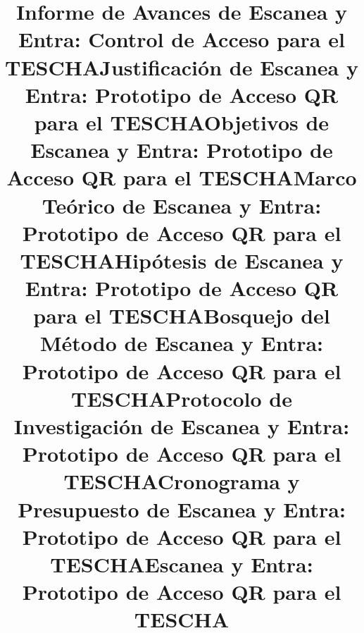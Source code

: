 \documentclass[stu,11pt,floatsintext,biblatex]{apa7}
\title{Informe de Avances de Escanea y Entra: Control de Acceso para el TESCHA}
\title{Justificación de Escanea y Entra: Prototipo de Acceso QR para el TESCHA}
\title{Objetivos de Escanea y Entra: Prototipo de Acceso QR para el TESCHA}
\title{Marco Teórico de Escanea y Entra: Prototipo de Acceso QR para el TESCHA}
\title{Hipótesis de Escanea y Entra: Prototipo de Acceso QR para el TESCHA}
\title{Bosquejo del Método de Escanea y Entra: Prototipo de Acceso QR para el TESCHA}
\title{Protocolo de Investigación de Escanea y Entra: Prototipo de Acceso QR para el TESCHA}
\title{Cronograma y Presupuesto de Escanea y Entra: Prototipo de Acceso QR para el TESCHA}
\title{Escanea y Entra: Prototipo de Acceso QR para el TESCHA}
\begin{document}
\maketitle
\justifying

\ifdefined\solomarcoteorico
	

	\printbibliography
\else
\ifdefined\solohipotesis
	

	\printbibliography
\else
\ifdefined\solocronograma
	
\else
\ifdefined\soloprotocolo
	

	

	\clearpage
	

	\clearpage
	

	\clearpage
	

	\clearpage
	

	\clearpage
	

	\clearpage
	

	\printbibliography

	\appendix

	\clearpage
	

	\clearpage
	

	\clearpage
	

	\clearpage
	

	\clearpage
	

	\clearpage
	

	\clearpage
	
\else
\ifdefined\solometodo
	

	\printbibliography

	\appendix

	\clearpage
	

	\clearpage
	

	\clearpage
	

	\clearpage
	

	\clearpage
	
\end{document}
